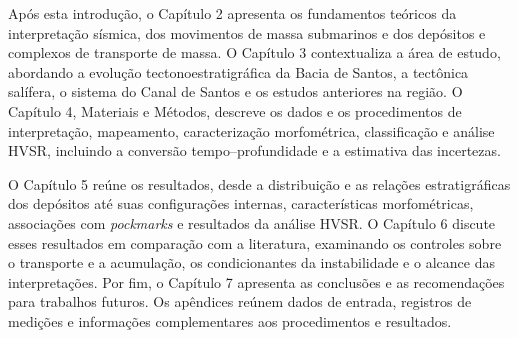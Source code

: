 Após esta introdução, o Capítulo 2 apresenta os fundamentos teóricos da interpretação sísmica, dos movimentos de massa submarinos e dos depósitos e complexos de transporte de massa. O Capítulo 3 contextualiza a área de estudo, abordando a evolução tectonoestratigráfica da Bacia de Santos, a tectônica salífera, o sistema do Canal de Santos e os estudos anteriores na região. O Capítulo 4, Materiais e Métodos, descreve os dados e os procedimentos de interpretação, mapeamento, caracterização morfométrica, classificação e análise HVSR, incluindo a conversão tempo--profundidade e a estimativa das incertezas.

O Capítulo 5 reúne os resultados, desde a distribuição e as relações estratigráficas dos depósitos até suas configurações internas, características morfométricas, associações com \textit{pockmarks} e resultados da análise HVSR. O Capítulo 6 discute esses resultados em comparação com a literatura, examinando os controles sobre o transporte e a acumulação, os condicionantes da instabilidade e o alcance das interpretações. Por fim, o Capítulo 7 apresenta as conclusões e as recomendações para trabalhos futuros. Os apêndices reúnem dados de entrada, registros de medições e informações complementares aos procedimentos e resultados.
